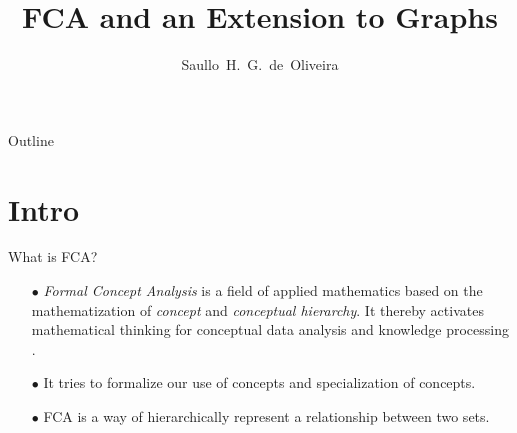 \documentclass[pdf,xcolor=table]{beamer}
\title{FCA and an Extension to Graphs}
\subtitle{}
\author[Presenter: Saullo Oliveira - shgo@dca.fee.unicamp.br]{Saullo~H.~G.~de~Oliveira}
\institute{FEEC - University of Campinas - Brazil}
\date{}
\begin{document}
\begin{frame}
    \titlepage
\end{frame}

\begin{frame}{Outline}
    \tableofcontents
\end{frame}

\section*{Intro}
\begin{frame}[t]{What is FCA?}
    \begin{itemize}
        \item[$\bullet$] \textit{Formal Concept Analysis} is a field of applied mathematics based on the mathematization of \textit{concept} and \textit{conceptual hierarchy}.
        It thereby activates mathematical thinking for conceptual data analysis and knowledge processing \parencite{Ganter1999}.
        \item[$\bullet$] It tries to formalize our use of concepts and specialization of concepts.
        \item[$\bullet$] FCA is a way of hierarchically represent a relationship between two sets.
    \end{itemize}
\end{frame}
\end{document}
